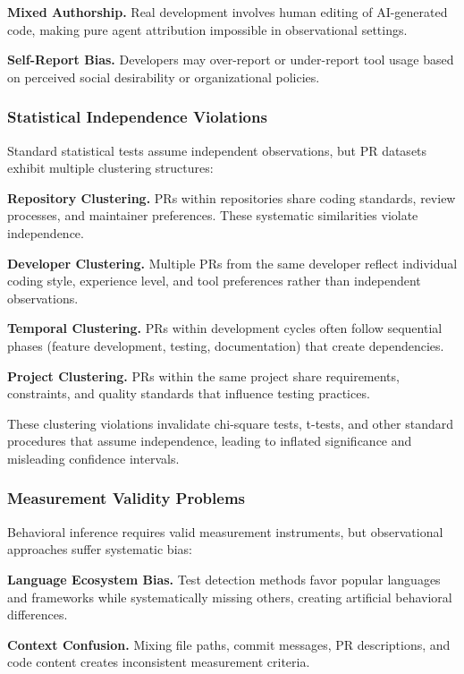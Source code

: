 \documentclass[conference]{IEEEtran}
\begin{document}
\textbf{Mixed Authorship.} Real development involves human editing of AI-generated code, making pure agent attribution impossible in observational settings.

\textbf{Self-Report Bias.} Developers may over-report or under-report tool usage based on perceived social desirability or organizational policies.

\subsubsection{Statistical Independence Violations}

Standard statistical tests assume independent observations, but PR datasets exhibit multiple clustering structures:

\textbf{Repository Clustering.} PRs within repositories share coding standards, review processes, and maintainer preferences. These systematic similarities violate independence.

\textbf{Developer Clustering.} Multiple PRs from the same developer reflect individual coding style, experience level, and tool preferences rather than independent observations.

\textbf{Temporal Clustering.} PRs within development cycles often follow sequential phases (feature development, testing, documentation) that create dependencies.

\textbf{Project Clustering.} PRs within the same project share requirements, constraints, and quality standards that influence testing practices.

These clustering violations invalidate chi-square tests, t-tests, and other standard procedures that assume independence, leading to inflated significance and misleading confidence intervals.

\subsubsection{Measurement Validity Problems}

Behavioral inference requires valid measurement instruments, but observational approaches suffer systematic bias:

\textbf{Language Ecosystem Bias.} Test detection methods favor popular languages and frameworks while systematically missing others, creating artificial behavioral differences.

\textbf{Context Confusion.} Mixing file paths, commit messages, PR descriptions, and code content creates inconsistent measurement criteria.
\end{document}
